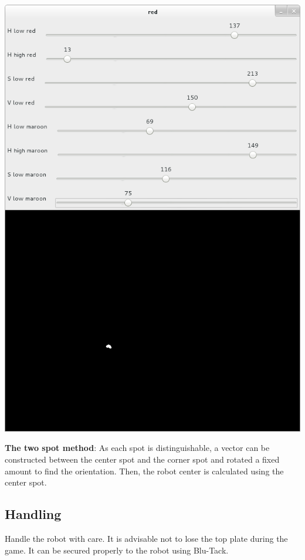 \documentclass[a4paper,12pt]{article}
\begin{document}
\begin{minipage}{0.6\textwidth}
\includegraphics[scale=0.3]{images/calibration3.png}
\end{minipage}
\begin{minipage}{0.4\textwidth}
\textbf{The two spot method}: As each spot is distinguishable, a vector can be constructed between the center spot and the corner spot and rotated a fixed amount to find the orientation. Then, the robot center is calculated using the center spot. 
\end{minipage}

\subsection{Handling} \label{handling}

Handle the robot with care. It is advisable not to lose the top plate during the game. It can be secured properly to the robot using Blu-Tack. 
\end{document}
